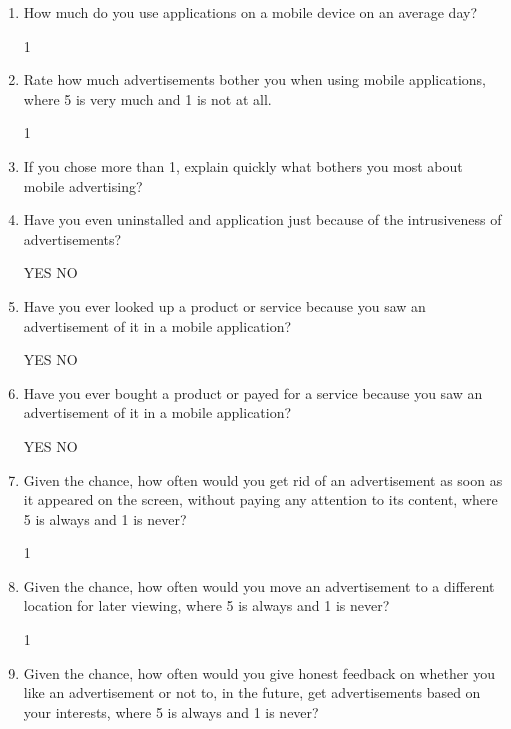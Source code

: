 
\begin{enumerate}
  \item How much do you use applications on a mobile device on an average day?
  
1	\tab{}	\tab{}	\tab\tab	4	\tab\tab	5
  		
  \item Rate how much advertisements bother you when using mobile applications, where 5 is very much and 1 is not at all.
  
1	\tab{}	\tab{}	\tab{}	\tab{}  
  
  \item If you chose more than 1, explain quickly what bothers you most about mobile advertising?
  
\noindent\makebox[\linewidth]{\rule{\textwidth}{0.4pt}}
\noindent\makebox[\linewidth]{\rule{\textwidth}{0.4pt}}
\noindent\makebox[\linewidth]{\rule{\textwidth}{0.4pt}}
  
  \item Have you even uninstalled and application just because of the intrusiveness of advertisements?
  
YES	\tab\tab	NO
  
  \item Have you ever looked up a product or service because you saw an advertisement of it in a mobile application?
  
YES	\tab\tab	NO  
  
  \item Have you ever bought a product or payed for a service because you saw an advertisement of it in a mobile application?
  
YES	\tab\tab	NO  
  
  \item Given the chance, how often would you get rid of an advertisement as soon as it appeared on the screen, without paying any attention to its content, where 5 is always and 1 is never?
  
1	\tab{}	\tab{}	\tab{}	\tab{}  
  
  \item Given the chance, how often would you move an advertisement to a different location for later viewing, where 5 is always and 1 is never?
  
1	\tab{}	\tab{}	\tab{}	\tab{}  
  
  \item Given the chance, how often would you give honest feedback on whether you like an advertisement or not to, in the future, get advertisements based on your interests, where 5 is always and 1 is never?
  

\end{enumerate}
